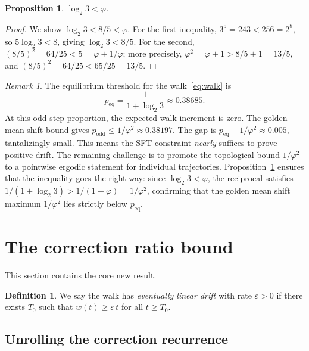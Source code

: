 \documentclass[manuscript]{aomart}
\theoremstyle{plain}
\newtheorem{proposition}[theorem]{Proposition}
\theoremstyle{definition}
\newtheorem{definition}[theorem]{Definition}
\theoremstyle{remark}
\newtheorem{remark}[theorem]{Remark}
\numberwithin{equation}{section}
\begin{document}
\begin{proposition}\label{prop:log23-lt-phi}
$\log_2 3 < \varphi$.
\end{proposition}

\begin{proof}
We show $\log_2 3 < 8/5 < \varphi$.  For the first inequality,
$3^5 = 243 < 256 = 2^8$, so $5 \log_2 3 < 8$, giving
$\log_2 3 < 8/5$.  For the second, $(8/5)^2 = 64/25 < 5 = \varphi +
1/\varphi$; more precisely, $\varphi^2 = \varphi + 1 > 8/5 + 1 =
13/5$, and $(8/5)^2 = 64/25 < 65/25 = 13/5$.
\end{proof}

\begin{remark}\label{rem:near-miss}
The equilibrium threshold for the walk~\eqref{eq:walk} is
\[
  p_{\mathrm{eq}} = \frac{1}{1 + \log_2 3} \approx 0.38685.
\]
At this odd-step proportion, the expected walk increment is zero.  The
golden mean shift bound gives
$p_{\mathrm{odd}} \le 1/\varphi^2 \approx 0.38197$.  The gap is
$p_{\mathrm{eq}} - 1/\varphi^2 \approx 0.005$, tantalizingly small.
This means the SFT constraint \emph{nearly} suffices to prove
positive drift.  The remaining challenge is to promote the topological
bound $1/\varphi^2$ to a pointwise ergodic statement for individual
trajectories.  Proposition~\ref{prop:log23-lt-phi} ensures that the
inequality goes the right way: since $\log_2 3 < \varphi$, the
reciprocal satisfies $1/(1+\log_2 3) > 1/(1+\varphi) = 1/\varphi^2$,
confirming that the golden mean shift maximum $1/\varphi^2$ lies
strictly below $p_{\mathrm{eq}}$.
\end{remark}

\section{The correction ratio bound}\label{sec:correction}

This section contains the core new result.

\begin{definition}\label{def:linear-drift}
We say the walk has \emph{eventually linear drift} with rate
$\varepsilon > 0$ if there exists $T_0$ such that
$w(t) \ge \varepsilon\,t$ for all $t \ge T_0$.
\end{definition}

\subsection{Unrolling the correction recurrence}
\end{document}
